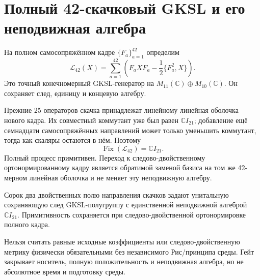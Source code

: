 \chapter{Полный 42-скачковый GKSL и его неподвижная алгебра}
\label{ch:v8-full-noise-42-jump-gksl-fixed-algebra-gate}

На полном самосопряжённом кадре $\{F_a\}_{a=1}^{42}$ определим
\begin{equation}
 \mathcal L_{42}(X)=\sum_{a=1}^{42}
 \left(F_aXF_a-\frac12\{F_a^2,X\}\right).
\end{equation}
Это точный конечномерный GKSL-генератор на
$M_{11}(\mathbb C)\oplus M_{10}(\mathbb C)$. Он сохраняет след, единицу и
концевую алгебру.

Прежние 25 операторов скачка принадлежат линейному линейная оболочка нового кадра. Их
совместный коммутант уже был равен $\mathbb CI_{21}$; добавление ещё
семнадцати самосопряжённых направлений может только уменьшить коммутант,
тогда как скаляры остаются в нём. Поэтому
\begin{equation}
 \operatorname{Fix}(\mathcal L_{42})=\mathbb CI_{21}.
\end{equation}
Полный процесс примитивен. Переход к следово-двойственному ортонормированному кадру
является обратимой заменой базиса на том же 42-мерном линейная оболочка и не меняет эту
неподвижную алгебру.

\begin{theorem}
Сорок два двойственных полю направления скачков задают унитальную сохраняющую след
GKSL-полугруппу с единственной неподвижной алгеброй $\mathbb CI_{21}$.
Примитивность сохраняется при следово-двойственной ортонормировке полного кадра.
\end{theorem}

\begin{nogocriterion}
Нельзя считать равные исходные коэффициенты или следово-двойственную метрику физически
обязательными без независимого Рис/принципа среды. Гейт закрывает носитель,
полную положительность и неподвижная алгебра, но не абсолютное время и подготовку
среды.
\end{nogocriterion}

